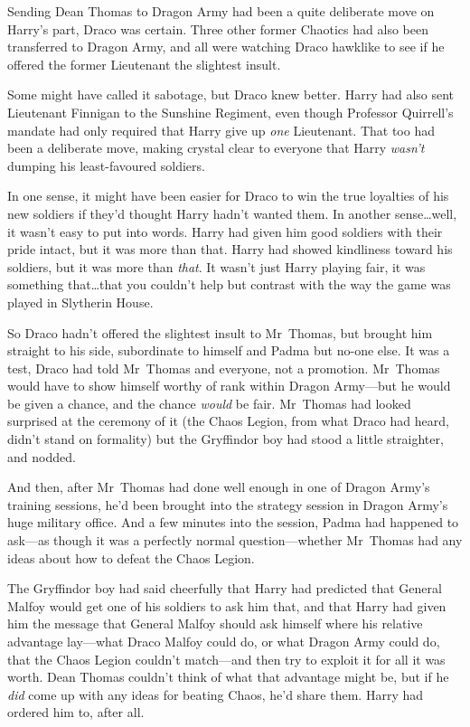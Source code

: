 Sending Dean Thomas to Dragon Army had been a quite deliberate move on Harry’s part, Draco was certain. Three other former Chaotics had also been transferred to Dragon Army, and all were watching Draco hawklike to see if he offered the former Lieutenant the slightest insult.

Some might have called it sabotage, but Draco knew better. Harry had also sent Lieutenant Finnigan to the Sunshine Regiment, even though Professor Quirrell’s mandate had only required that Harry give up \emph{one} Lieutenant. That too had been a deliberate move, making crystal clear to everyone that Harry \emph{wasn’t} dumping his least-favoured soldiers.

In one sense, it might have been easier for Draco to win the true loyalties of his new soldiers if they’d thought Harry hadn’t wanted them. In another sense…well, it wasn’t easy to put into words. Harry had given him good soldiers with their pride intact, but it was more than that. Harry had showed kindliness toward his soldiers, but it was more than \emph{that}. It wasn’t just Harry playing fair, it was something that…that you couldn’t help but contrast with the way the game was played in Slytherin House.

So Draco hadn’t offered the slightest insult to Mr~Thomas, but brought him straight to his side, subordinate to himself and Padma but no-one else. It was a test, Draco had told Mr~Thomas and everyone, not a promotion. Mr~Thomas would have to show himself worthy of rank within Dragon Army—but he would be given a chance, and the chance \emph{would} be fair. Mr~Thomas had looked surprised at the ceremony of it (the Chaos Legion, from what Draco had heard, didn’t stand on formality) but the Gryffindor boy had stood a little straighter, and nodded.

And then, after Mr~Thomas had done well enough in one of Dragon Army’s training sessions, he’d been brought into the strategy session in Dragon Army’s huge military office. And a few minutes into the session, Padma had happened to ask—as though it was a perfectly normal question—whether Mr~Thomas had any ideas about how to defeat the Chaos Legion.

The Gryffindor boy had said cheerfully that Harry had predicted that General Malfoy would get one of his soldiers to ask him that, and that Harry had given him the message that General Malfoy should ask himself where his relative advantage lay—what Draco Malfoy could do, or what Dragon Army could do, that the Chaos Legion couldn’t match—and then try to exploit it for all it was worth. Dean Thomas couldn’t think of what that advantage might be, but if he \emph{did} come up with any ideas for beating Chaos, he’d share them. Harry had ordered him to, after all.

